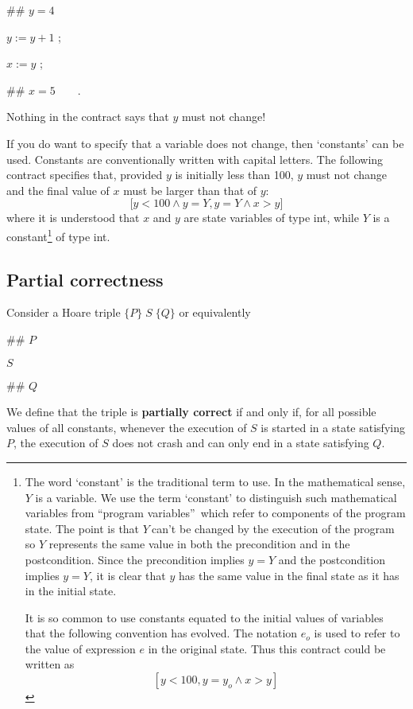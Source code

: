 \documentclass[11pt]{article}%
\begin{document}
\begin{code}
\#\# $y=4$

$y:=y+1$ ;

$x:=y$ ;

\#\# $x=5\qquad$.
\end{code}

\noindent Nothing in the contract says that $y$ must not change!

If you do want to specify that a variable does not change, then `constants'
can be used. Constants are conventionally written with capital letters. The
following contract specifies that, provided $y$ is initially less than 100,
$y$ must not change and the final value of $x$ must be larger than that of
$y$:%
\[
\lbrack y<\mathrm{100}\wedge y=Y,y=Y\wedge x>y]
\]
where it is understood that $x$ and $y$ are state variables of type
\textsf{int},\textsf{ }while $Y$ is a constant\footnote{The word `constant' is
the traditional term to use. In the mathematical sense, $Y$ is a variable. We
use the term `constant' to distinguish such mathematical variables from
\textquotedblleft program variables\textquotedblright\ which refer to
components of the program state. The point is that $Y\ $can't be changed by
the execution of the program so $Y$ represents the same value in both the
precondition and in the postcondition. Since the precondition implies $y=Y$
and the postcondition implies $y=Y$, it is clear that $y$ has the same value
in the final state as it has in the initial state.
\par
It is so common to use constants equated to the initial values of variables
that the following convention has evolved. The notation $e_{o}$ is used to
refer to the value of expression $e$ in the original state. Thus this contract
could be written as%
\[
\left[  y<100,y=y_{o}\wedge x>y\right]
\]
} of type \textsf{int}.

\subsection{Partial correctness}

Consider a Hoare triple $\{P\}\;S\;\{Q\}$ or equivalently

\begin{code}
\#\# $P$

$S$

\#\# $Q$
\end{code}

\noindent We define that the triple is \textbf{partially correct} if and only
if, for all possible values of all constants, whenever the execution of $S$ is
started in a state satisfying $P$, the execution of $S$ does not crash and can
only end in a state satisfying $Q$.
\end{document}
